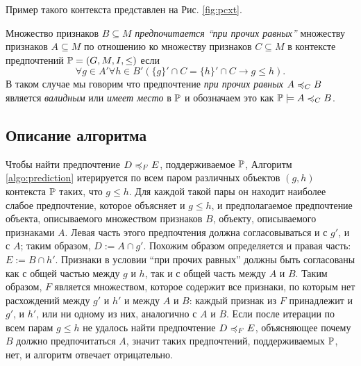 		Пример такого контекста представлен на Рис. \ref{fig:pcxt}.
		
		\begin{definition}
			Множество признаков $B \subseteq M$ \emph{предпочитается \enquote{при прочих равных}} множеству признаков $A \subseteq M$ по отношению ко множеству признаков $C \subseteq M$ в контексте предпочтений $\mathbb{P} = (G, M, I, \leq)$ если 
			\[\forall g \in A' \forall h \in B'(\{g\}' \cap C = \{h\}' \cap C \to g \leq h).\]
			В таком случае мы говорим что предпочтение \emph{при прочих равных} $A \preccurlyeq_{C} B$ является \emph{валидным} или \emph{имеет место} в $\mathbb{P}$ и обозначаем это как $\mathbb{P} \models A \preccurlyeq_{C} B$.
		\end{definition}
	
	\subsection{Описание алгоритма}
		Чтобы найти предпочтение $D \preccurlyeq_{F} E$, поддерживаемое $\mathbb{P}$, Алгоритм \ref{algo:prediction} итерируется по всем паром различных объектов $(g, h)$ контекста $\mathbb{P}$ таких, что $g \leq h$. Для каждой такой пары он находит наиболее слабое предпочтение, которое объясняет и $g \leq h$, и предполагаемое предпочтение объекта, описываемого множеством признаков $B$, объекту, описываемого признаками $A$. Левая часть этого предпочтения должна согласовываться и с $g'$, и с $A$; таким образом, $D := A \cap g'$. Похожим образом определяется и правая часть: $E := B \cap h'$. Признаки в условии \enquote{при прочих равных} должны быть согласованы как с общей частью между $g$ и $h$, так и с общей часть между $A$ и $B$. Таким образом, $F$ является множеством, которое содержит все признаки, по которым нет расхождений между $g'$ и $h'$ и между $A$ и $B$: каждый признак из $F$ принадлежит и $g'$, и $h'$, или ни одному из них, аналогично с $A$ и $B$. %
		Если после итерации по всем парам $g \leq h$ не удалось найти предпочтение $D \preccurlyeq_{F} E$, объясняющее почему $B$ должно предпочитаться $A$, значит таких предпочтений, поддерживаемых $\mathbb{P}$, нет, и алгоритм отвечает отрицательно.
	
